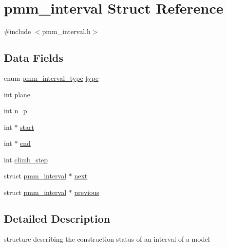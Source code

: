 \hypertarget{structpmm__interval}{\section{pmm\-\_\-interval Struct Reference}
\label{structpmm__interval}
}


{\ttfamily \#include $<$pmm\-\_\-interval.\-h$>$}

\subsection*{Data Fields}
\begin{DoxyCompactItemize}
\item 
enum \hyperlink{pmm__interval_8h_a7761cca292313dc9c4b69497ff82f498}{pmm\-\_\-interval\-\_\-type} \hyperlink{structpmm__interval_aa49aeaf84ef135481151dbff305fac3b}{type}
\item 
int \hyperlink{structpmm__interval_a57e7d507d375f4c049c0536755baa65e}{plane}
\item 
int \hyperlink{structpmm__interval_ab448b7abb9a5a7c440f684acaa20ff68}{n\-\_\-p}
\item 
int $\ast$ \hyperlink{structpmm__interval_a799c659f1aa43b1d109affe4bfdbd309}{start}
\item 
int $\ast$ \hyperlink{structpmm__interval_aac71aae8e85434b2e59d90206a1e3555}{end}
\item 
int \hyperlink{structpmm__interval_aa11fa2ec3e9bd29fd82e9a19ca1d070b}{climb\-\_\-step}
\item 
struct \hyperlink{structpmm__interval}{pmm\-\_\-interval} $\ast$ \hyperlink{structpmm__interval_aecf4d52e301ad5bea383ca6a7db7fc1f}{next}
\item 
struct \hyperlink{structpmm__interval}{pmm\-\_\-interval} $\ast$ \hyperlink{structpmm__interval_a55a49a209aa33004181e0af975cd558e}{previous}
\end{DoxyCompactItemize}


\subsection{Detailed Description}
structure describing the construction status of an interval of a model 

